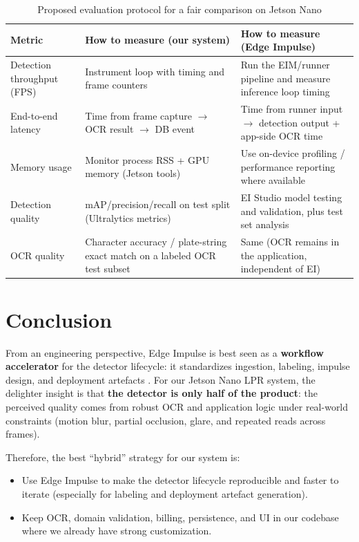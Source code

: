 \begin{table}[htbp]
	\centering
	\caption{Proposed evaluation protocol for a fair comparison on Jetson Nano}
	\label{tab:edge_impulse_eval_protocol}
	\begin{tabular}{@{}p{}p{}p{}@{}}
		\toprule
		\textbf{Metric} & \textbf{How to measure (our system)} & \textbf{How to measure (Edge Impulse)} \\ \midrule
		Detection throughput (FPS) &
		Instrument \FILE{Code/LicencePlateDetection/jetson\_app/detector.py} loop with timing and frame counters &
		Run the EIM/runner pipeline and measure inference loop timing \cite{EdgeImpulseLinuxEIM} \\ \addlinespace
		End-to-end latency &
		Time from frame capture $\rightarrow$ OCR result $\rightarrow$ DB event &
		Time from runner input $\rightarrow$ detection output + app-side OCR time \\ \addlinespace
		Memory usage &
		Monitor process RSS + GPU memory (Jetson tools) &
		Use on-device profiling / performance reporting where available \cite{EdgeImpulseBYOM} \\ \addlinespace
		Detection quality &
		mAP/precision/recall on test split (Ultralytics metrics) &
		EI Studio model testing and validation, plus test set analysis \cite{EdgeImpulseStudioOverview} \\ \addlinespace
		OCR quality &
		Character accuracy / plate-string exact match on a labeled OCR test subset &
		Same (OCR remains in the application, independent of EI) \\ \bottomrule
	\end{tabular}
\end{table}

\section{Conclusion}
\label{sec:edge_impulse_conclusion}

\noindent
From an engineering perspective, Edge Impulse is best seen as a \textbf{workflow accelerator} for the detector lifecycle:
it standardizes ingestion, labeling, impulse design, and deployment artefacts \cite{EdgeImpulseImpulseDesign,EdgeImpulseLinuxEIM}.
For our Jetson Nano LPR system, the delighter insight is that \textbf{the detector is only half of the product}:
the perceived quality comes from robust OCR and application logic under real-world constraints (motion blur, partial occlusion, glare, and repeated reads across frames).

\noindent
Therefore, the best ``hybrid'' strategy for our system is:
\begin{itemize}
	\item Use Edge Impulse to make the detector lifecycle reproducible and faster to iterate (especially for labeling and deployment artefact generation).
	\item Keep OCR, domain validation, billing, persistence, and UI in our codebase where we already have strong customization.
\end{itemize}
